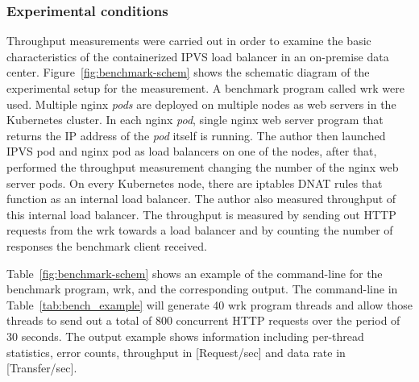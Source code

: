 \subsubsection{Experimental conditions}

Throughput measurements were carried out in order to examine the basic characteristics of the containerized IPVS load balancer in an on-premise data center.
Figure~\ref{fig:benchmark-schem} shows the schematic diagram of the experimental setup for the measurement. 
A benchmark program called wrk \cite{Glozer2016} were used.
Multiple nginx {\em pods} are deployed on multiple nodes as web servers in the Kubernetes cluster.
In each nginx {\em pod}, single nginx web server program that returns the IP address of the {\em pod} itself is running.
The author then launched IPVS pod and nginx pod as load balancers on one of the nodes, after that, performed the throughput measurement changing the number of the nginx web server pods.
On every Kubernetes node, there are iptables DNAT rules that function as an internal load balancer.
The author also measured throughput of this internal load balancer.
The throughput is measured by sending out HTTP requests from the wrk towards a load balancer and by counting the number of responses the benchmark client received.

Table~\ref{fig:benchmark-schem} shows an example of the command-line for the benchmark program, wrk, and the corresponding output.
The command-line in Table~\ref{tab:bench_example} will generate 40 wrk program threads
and allow those threads to send out a total of 800 concurrent HTTP requests over the period of 30 seconds.
The output example shows information including per-thread statistics, error counts, throughput in [Request/sec] and data rate in [Transfer/sec].


